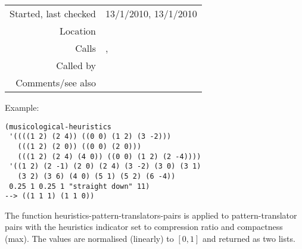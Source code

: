 \vspace{0.3cm}
\begin{tabular}{r|p{8cm}}
Started, last checked & 13/1/2010, 13/1/2010 \\
Location & \nameref{sec:evaluation-heuristics} \\
Calls & \nameref{fun:heuristics-pattern-translators-pairs}, \nameref{fun:normalise-0-1} \\
Called by & \\
Comments/see also &
\end{tabular}

\vspace{0.5cm}
\noindent Example:
\begin{verbatim}
(musicological-heuristics
 '((((1 2) (2 4)) ((0 0) (1 2) (3 -2)))
   (((1 2) (2 0)) ((0 0) (2 0)))
   (((1 2) (2 4) (4 0)) ((0 0) (1 2) (2 -4))))
 '((1 2) (2 -1) (2 0) (2 4) (3 -2) (3 0) (3 1)
   (3 2) (3 6) (4 0) (5 1) (5 2) (6 -4))
 0.25 1 0.25 1 "straight down" 11)
--> ((1 1 1) (1 1 0))

\end{verbatim}

\noindent The function
heuristics-pattern-translators-pairs is applied to
pattern-translator pairs with the heuristics indicator
set to compression ratio and compactness (max). The
values are normalised (linearly) to $[0, 1]$ and
returned as two lists.
















